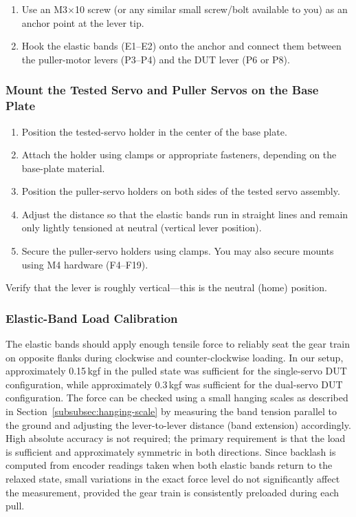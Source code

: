 \documentclass[11pt,letterpaper]{article}
\begin{document}
\begin{enumerate}
    \item Use an M3$\times$10 screw (or any similar small screw/bolt available to you) as an anchor point at the lever tip.
    \item Hook the elastic bands (E1--E2) onto the anchor and connect them between the puller-motor levers (P3--P4) and the DUT lever (P6 or P8).
\end{enumerate}

\subsubsection{Mount the Tested Servo and Puller Servos on the Base Plate}
\label{subsec:mount-holders}

\begin{enumerate}
    \item Position the tested-servo holder in the center of the base plate.
    \item Attach the holder using clamps or appropriate fasteners, depending on the base-plate material.
    \item Position the puller-servo holders on both sides of the tested servo assembly.
    \item Adjust the distance so that the elastic bands run in straight lines and remain only lightly tensioned at neutral (vertical lever position).
    \item Secure the puller-servo holders using clamps. You may also secure mounts using M4 hardware (F4--F19).
\end{enumerate}

Verify that the lever is roughly vertical---this is the neutral (home) position.

\subsubsection{Elastic-Band Load Calibration}
\label{subsubsec:load-calibration}

The elastic bands should apply enough tensile force to reliably seat the gear train on opposite flanks during clockwise and counter-clockwise loading. In our setup, approximately 0.15\,kgf in the pulled state was sufficient for the single-servo DUT configuration, while approximately 0.3\,kgf was sufficient for the dual-servo DUT configuration. The force can be checked using a small hanging scales as described in Section~\ref{subsubsec:hanging-scale} by measuring the band tension parallel to the ground and adjusting the lever-to-lever distance (band extension) accordingly. High absolute accuracy is not required; the primary requirement is that the load is sufficient and approximately symmetric in both directions. Since backlash is computed from encoder readings taken when both elastic bands return to the relaxed state, small variations in the exact force level do not significantly affect the measurement, provided the gear train is consistently preloaded during each pull.
\end{document}
